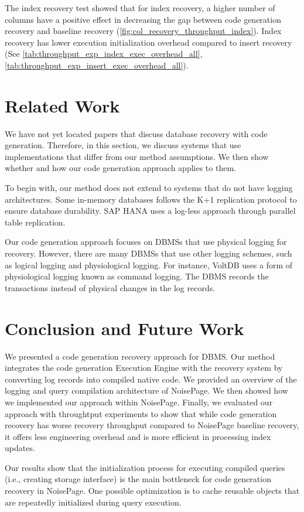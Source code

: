 \documentclass[12pt]{cmuthesis}
\begin{document}
The index recovery test showed that for index recovery, a higher number of columns have a positive effect in decreasing the gap between code generation recovery and baseline recovery (\cref{fig:col_recovery_throughput_index}). Index recovery has lower execution initialization overhead compared to insert recovery (See \cref{tab:throughput_exp_index_exec_overhead_all}, \cref{tab:throughput_exp_insert_exec_overhead_all}).

\chapter{Related Work}
We have not yet located papers that discuss database recovery with code generation. Therefore, in this section, we discuss systems that use implementations that differ from our method assumptions. We then show whether and how our code generation approach applies to them.

To begin with, our method does not extend to systems that do not have logging architectures. Some in-memory databases follows the K+1 replication protocol to ensure database durability. SAP HANA\cite{lee18} uses a log-less approach through parallel table replication.

Our code generation approach focuses on DBMSs that use physical logging for recovery. However, there are many DBMSs that use other logging schemes, such as logical logging and physiological logging. For instance, VoltDB\cite{malviya14} uses a form of physiological logging known as command logging. The DBMS records the transactions instead of physical changes in the log records.

\chapter{Conclusion and Future Work}
We presented a code generation recovery approach for DBMS. Our method integrates the code generation Execution Engine with the recovery system by converting log records into compiled native code. We provided an overview of the logging and query compilation architecture of NoisePage. We then showed how we implemented our approach within NoisePage. Finally, we evaluated our approach with throughtput experiments to show that while code generation recovery has worse recovery throughput compared to NoisePage baseline recovery, it offers less engineering overhead and is more efficient in processing index updates.

Our results show that the initialization process for executing compiled queries (i.e., creating storage interface) is the main bottleneck for code generation recovery in NoisePage. One possible optimization is to cache reusable objects that are repeatedly initialized during query execution.
\end{document}
